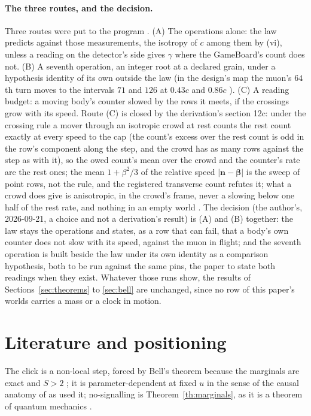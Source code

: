 \documentclass[11pt]{article}
\theoremstyle{definition}
\begin{document}
\paragraph{The three routes, and the decision.} Three routes were put
to the program \cite{log}. (A) The operations alone: the law predicts
against those measurements, the isotropy of $c$ among them by (vi),
unless a reading on the detector's side gives $\gamma$ where the
GameBoard's count does not. (B) A seventh operation, an integer root at
a declared grain, under a hypothesis identity of its own outside the law
(in the design's map the muon's $64$th turn moves to the intervals $71$
and $126$ at $0.43c$ and $0.86c$ \cite{lightspeed}). (C) A reading
budget: a moving body's counter slowed by the rows it meets, if the
crossings grow with its speed. Route (C) is closed by the derivation's
section 12c: under the crossing rule a mover through an isotropic crowd
at rest counts the rest count exactly at every speed to the cap (the
count's excess over the rest count is odd in the row's component along
the step, and the crowd has as many rows against the step as with it),
so the owed count's mean over the crowd and the counter's rate are the
rest ones; the mean $1 + \beta^2/3$ of the
relative speed $|\mathbf n - \boldsymbol\beta|$ is the sweep of point
rows, not the rule, and the registered transverse count refutes it; what
a crowd does give is anisotropic, in the crowd's frame, never a slowing
below one half of the rest rate, and nothing in an empty world
\cite{derivations}. The decision (the author's, 2026-09-21, a choice
and not a derivation's result) is (A) and (B) together: the law stays the operations and states, as a row that can
fail, that a body's own counter does not slow with its speed, against the
muon in flight; and the seventh operation is built beside the law under
its own identity as a comparison hypothesis, both to be run against the
same pins, the paper to state both readings when they exist. Whatever
those runs show, the results of Sections~\ref{sec:theorems} to
\ref{sec:bell} are unchanged, since no row of this paper's worlds
carries a mass or a clock in motion.

\section{Literature and positioning}\label{sec:lit}

The click is a non-local step, forced by Bell's theorem because the
marginals are exact and $S > 2$ \cite{bell1964,chsh1969}; it is
parameter-dependent at fixed $u$ in the sense of the causal anatomy of
\cite{jarrett1984,shimony1986} as \cite{paper1} used it; no-signalling is
Theorem~\ref{th:marginals}, as it is a theorem of quantum mechanics
\cite{grw1980}.
\end{document}
